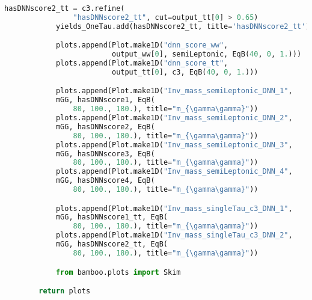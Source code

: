 \begin{lstlisting}[language=Python, caption=Python module of the analysis used in Bamboo framework, label={bamboocode}]
            hasDNNscore2_tt = c3.refine(
                "hasDNNscore2_tt", cut=output_tt[0] > 0.65)
            yields_OneTau.add(hasDNNscore2_tt, title='hasDNNscore2_tt')

            plots.append(Plot.make1D("dnn_score_ww",
                         output_ww[0], semiLeptonic, EqB(40, 0, 1.)))
            plots.append(Plot.make1D("dnn_score_tt",
                         output_tt[0], c3, EqB(40, 0, 1.)))

            plots.append(Plot.make1D("Inv_mass_semiLeptonic_DNN_1",
            mGG, hasDNNscore1, EqB(
                80, 100., 180.), title="m_{\gamma\gamma}"))
            plots.append(Plot.make1D("Inv_mass_semiLeptonic_DNN_2",
            mGG, hasDNNscore2, EqB(
                80, 100., 180.), title="m_{\gamma\gamma}"))
            plots.append(Plot.make1D("Inv_mass_semiLeptonic_DNN_3",
            mGG, hasDNNscore3, EqB(
                80, 100., 180.), title="m_{\gamma\gamma}"))
            plots.append(Plot.make1D("Inv_mass_semiLeptonic_DNN_4",
            mGG, hasDNNscore4, EqB(
                80, 100., 180.), title="m_{\gamma\gamma}"))

            plots.append(Plot.make1D("Inv_mass_singleTau_c3_DNN_1",
            mGG, hasDNNscore1_tt, EqB(
                80, 100., 180.), title="m_{\gamma\gamma}"))
            plots.append(Plot.make1D("Inv_mass_singleTau_c3_DNN_2",
            mGG, hasDNNscore2_tt, EqB(
                80, 100., 180.), title="m_{\gamma\gamma}"))

            from bamboo.plots import Skim

        return plots

\end{lstlisting}